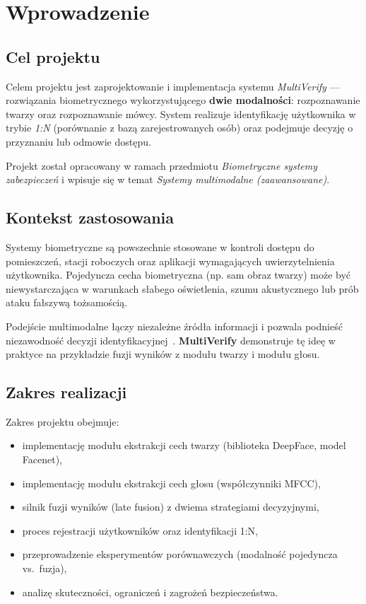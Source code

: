 \chapter{Wprowadzenie}
\label{cha:wprowadzenie}

\section{Cel projektu}

Celem projektu jest zaprojektowanie i implementacja systemu \emph{MultiVerify} --- rozwiązania biometrycznego wykorzystującego \textbf{dwie modalności}: rozpoznawanie twarzy oraz rozpoznawanie mówcy. System realizuje identyfikację użytkownika w trybie \emph{1:N} (porównanie z bazą zarejestrowanych osób) oraz podejmuje decyzję o przyznaniu lub odmowie dostępu.

Projekt został opracowany w ramach przedmiotu \emph{Biometryczne systemy zabezpieczeń} i wpisuje się w temat \emph{Systemy multimodalne (zaawansowane)}.

\section{Kontekst zastosowania}

Systemy biometryczne są powszechnie stosowane w kontroli dostępu do pomieszczeń, stacji roboczych oraz aplikacji wymagających uwierzytelnienia użytkownika. Pojedyncza cecha biometryczna (np. sam obraz twarzy) może być niewystarczająca w warunkach słabego oświetlenia, szumu akustycznego lub prób ataku fałszywą tożsamością.

Podejście multimodalne łączy niezależne źródła informacji i pozwala podnieść niezawodność decyzji identyfikacyjnej~\cite{jain2004multimodal,ross2006multimodal}. \textbf{MultiVerify} demonstruje tę ideę w praktyce na przykładzie fuzji wyników z modułu twarzy i modułu głosu.

\section{Zakres realizacji}

Zakres projektu obejmuje:
\begin{itemize}
    \item implementację modułu ekstrakcji cech twarzy (biblioteka DeepFace, model Facenet),
    \item implementację modułu ekstrakcji cech głosu (współczynniki MFCC),
    \item silnik fuzji wyników (late fusion) z dwiema strategiami decyzyjnymi,
    \item proces rejestracji użytkowników oraz identyfikacji 1:N,
    \item przeprowadzenie eksperymentów porównawczych (modalność pojedyncza vs.\ fuzja),
    \item analizę skuteczności, ograniczeń i zagrożeń bezpieczeństwa.
\end{itemize}

